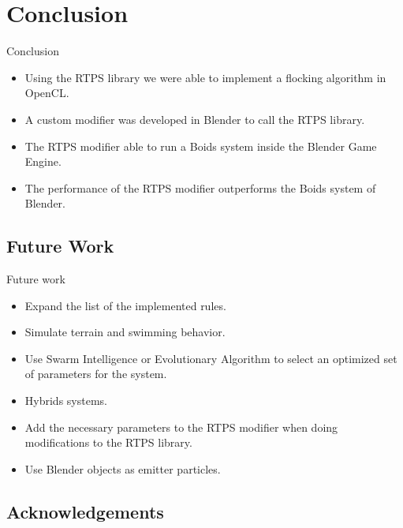 \documentclass[red]{beamer}
\begin{document}
\section{Conclusion}
\begin{frame}{Conclusion}
	\begin{itemize}
		\item Using the RTPS library we were able to implement a flocking algorithm in OpenCL.
		\item A custom modifier was developed in Blender to call the RTPS library.
		\item The RTPS modifier able to run a Boids system inside the Blender Game Engine.
		\item The performance of the RTPS modifier outperforms the Boids system of Blender.
	\end{itemize}
\end{frame}

\subsection{Future Work}
\begin{frame}{Future work}
	\begin{itemize}
		\item Expand the list of the implemented rules.
		\item Simulate terrain and swimming behavior.
		\item Use Swarm Intelligence or Evolutionary Algorithm to select an optimized set of parameters for the system.
		\item Hybrids systems.
		\item Add the necessary parameters to the RTPS modifier when doing modifications to the RTPS library.
		\item Use Blender objects as emitter particles.
	\end{itemize}
\end{frame}

\subsection{Acknowledgements}
\end{document}

